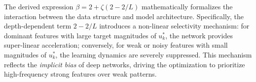 \documentclass{article}
\theoremstyle{plain}
\theoremstyle{definition}
\theoremstyle{remark}
\begin{document}
The derived expression $\beta = 2 + \zeta(2 - 2/L)$ mathematically formalizes the interaction between the data structure and model architecture.
Specifically, the depth-dependent term $2 - 2/L$ introduces a non-linear selectivity mechanism: for dominant features with large target magnitudes of $u_k^*$, the network provides super-linear acceleration; conversely, for weak or noisy features with small magnitudes of $u_k^*$, the learning dynamics are severely suppressed. This mechanism reflects the \textit{implicit bias} of deep networks, driving the optimization to prioritize high-frequency strong features over weak patterns.
\end{document}
